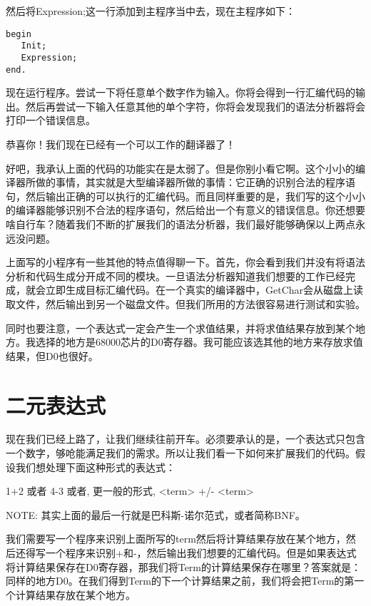 然后将Expression;这一行添加到主程序当中去，现在主程序如下：
                              
\begin{verbatim}
begin
   Init;
   Expression;
end.
\end{verbatim}

现在运行程序。尝试一下将任意单个数字作为输入。你将会得到一行汇编代码的输出。然后再尝试一下输入任意其他的单个字符，你将会发现我们的语法分析器将会打印一个错误信息。

恭喜你！我们现在已经有一个可以工作的翻译器了！

好吧，我承认上面的代码的功能实在是太弱了。但是你别小看它啊。这个小小的编译器所做的事情，其实就是大型编译器所做的事情：它正确的识别合法的程序语句，然后输出正确的可以执行的汇编代码。而且同样重要的是，我们写的这个小小的编译器能够识别不合法的程序语句，然后给出一个有意义的错误信息。你还想要啥自行车？随着我们不断的扩展我们的语法分析器，我们最好能够确保以上两点永远没问题。

上面写的小程序有一些其他的特点值得聊一下。首先，你会看到我们并没有将语法分析和代码生成分开成不同的模块。一旦语法分析器知道我们想要的工作已经完成，就会立即生成目标汇编代码。在一个真实的编译器中，GetChar会从磁盘上读取文件，然后输出到另一个磁盘文件。但我们所用的方法很容易进行测试和实验。

同时也要注意，一个表达式一定会产生一个求值结果，并将求值结果存放到某个地方。我选择的地方是68000芯片的D0寄存器。我可能应该选其他的地方来存放求值结果，但D0也很好。

\section{二元表达式}

现在我们已经上路了，让我们继续往前开车。必须要承认的是，一个表达式只包含一个数字，够呛能满足我们的需求。所以让我们看一下如何来扩展我们的代码。假设我们想处理下面这种形式的表达式：

\begin{tcolorbox}
                           1+2
或者                       4-3
或者, 更一般的形式, <term> +/- <term>
\end{tcolorbox}

NOTE: 其实上面的最后一行就是巴科斯-诺尔范式，或者简称BNF。

我们需要写一个程序来识别上面所写的term然后将计算结果存放在某个地方，然后还得写一个程序来识别+和-，然后输出我们想要的汇编代码。但是如果表达式将计算结果保存在D0寄存器，那我们将Term的计算结果保存在哪里？答案就是：同样的地方D0。在我们得到Term的下一个计算结果之前，我们将会把Term的第一个计算结果存放在某个地方。

